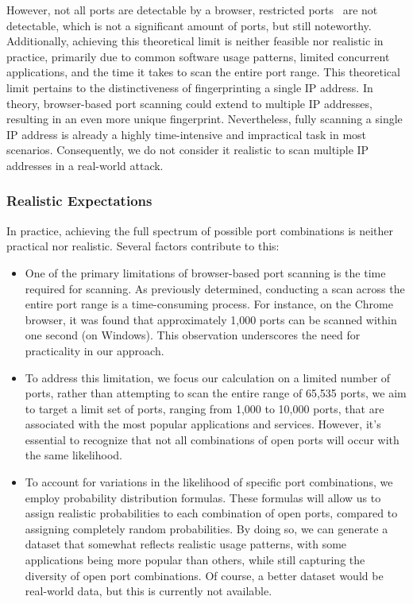 However, not all ports are detectable by a browser, restricted ports~ are not detectable, which is not a significant amount of ports, but still noteworthy.
Additionally, achieving this theoretical limit is neither feasible nor realistic in practice, primarily due to common software usage patterns, limited concurrent applications, and the time it takes to scan the entire port range. 
This theoretical limit pertains to the distinctiveness of fingerprinting a single IP address. In theory, browser-based port scanning could extend to multiple IP addresses, resulting in an even more unique fingerprint. 
Nevertheless, fully scanning a single IP address is already a highly time-intensive and impractical task in most scenarios. 
Consequently, we do not consider it realistic to scan multiple IP addresses in a real-world attack.
\subsubsection{Realistic Expectations}

In practice, achieving the full spectrum of possible port combinations is neither practical nor realistic. Several factors contribute to this:

\begin{itemize}
\item One of the primary limitations of browser-based port scanning is the time required for scanning. As previously determined, conducting a scan across the entire port range is a time-consuming process. For instance, on the Chrome browser, it was found that approximately 1,000 ports can be scanned within one second (on Windows). This observation underscores the need for practicality in our approach.

\item To address this limitation, we focus our calculation on a limited number of ports, rather than attempting to scan the entire range of 65,535 ports, we aim to target a limit set of ports, ranging from 1,000 to 10,000 ports, that are associated with the most popular applications and services. However, it's essential to recognize that not all combinations of open ports will occur with the same likelihood.

\item To account for variations in the likelihood of specific port combinations, we employ probability distribution formulas. These formulas will allow us to assign realistic probabilities to each combination of open ports, compared to assigning completely random probabilities. By doing so, we can generate a dataset that somewhat reflects realistic usage patterns, with some applications being more popular than others, while still capturing the diversity of open port combinations. Of course, a better dataset would be real-world data, but this is currently not available.
\end{itemize}


